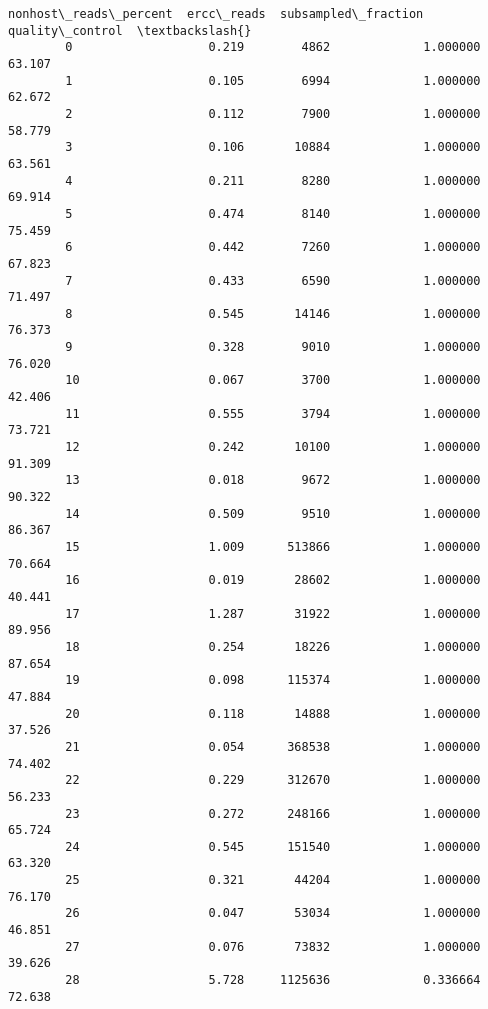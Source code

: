 \documentclass[11pt]{article}
\begin{document}
\begin{Verbatim}[commandchars=\\\{\}]
            nonhost\_reads\_percent  ercc\_reads  subsampled\_fraction  quality\_control  \textbackslash{}
        0                   0.219        4862             1.000000           63.107   
        1                   0.105        6994             1.000000           62.672   
        2                   0.112        7900             1.000000           58.779   
        3                   0.106       10884             1.000000           63.561   
        4                   0.211        8280             1.000000           69.914   
        5                   0.474        8140             1.000000           75.459   
        6                   0.442        7260             1.000000           67.823   
        7                   0.433        6590             1.000000           71.497   
        8                   0.545       14146             1.000000           76.373   
        9                   0.328        9010             1.000000           76.020   
        10                  0.067        3700             1.000000           42.406   
        11                  0.555        3794             1.000000           73.721   
        12                  0.242       10100             1.000000           91.309   
        13                  0.018        9672             1.000000           90.322   
        14                  0.509        9510             1.000000           86.367   
        15                  1.009      513866             1.000000           70.664   
        16                  0.019       28602             1.000000           40.441   
        17                  1.287       31922             1.000000           89.956   
        18                  0.254       18226             1.000000           87.654   
        19                  0.098      115374             1.000000           47.884   
        20                  0.118       14888             1.000000           37.526   
        21                  0.054      368538             1.000000           74.402   
        22                  0.229      312670             1.000000           56.233   
        23                  0.272      248166             1.000000           65.724   
        24                  0.545      151540             1.000000           63.320   
        25                  0.321       44204             1.000000           76.170   
        26                  0.047       53034             1.000000           46.851   
        27                  0.076       73832             1.000000           39.626   
        28                  5.728     1125636             0.336664           72.638   

\end{Verbatim}
\end{document}
